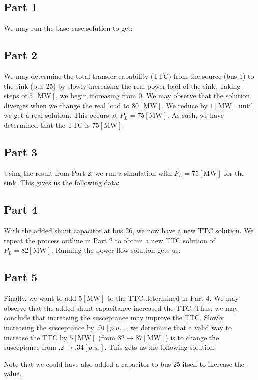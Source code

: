 \documentclass[
	letterpaper, %
	10pt, %
]{CSUniSchoolLabReport}
\begin{document}
\subsection{Part 1}

We may run the base case solution to get:


\subsection{Part 2}

We may determine the total transfer capability (TTC) from the source (bus 1) to the sink (bus 25) by slowly increasing the real power load of the sink. Taking steps of $5[\si{\mega\watt}]$, we begin increasing from 0. We may observe that the solution diverges when we change the real load to $80[\si{\mega\watt}]$. We reduce by $1[\si{\mega\watt}]$ until we get a real solution. This occurs at $P_L=75[\si{\mega\watt}]$. As such, we have determined that the TTC is $75[\si{\mega\watt}]$.

\subsection{Part 3}

Using the result from Part 2, we run a simulation with $P_L=75[\si{\mega\watt}]$ for the sink. This gives us the following data:


\subsection{Part 4}

With the added shunt capacitor at bus 26, we now have a new TTC solution. We repeat the process outline in Part 2 to obtain a new TTC solution of $P_L=82[\si{\mega\watt}]$. Running the power flow solution gets us:


\subsection{Part 5}

Finally, we want to add $5[\si{\mega\watt}]$ to the TTC determined in Part 4. We may observe that the added shunt capacitance increased the TTC. Thus, we may conclude that increasing the susceptance may improve the TTC. Slowly increasing the susceptance by $.01[p.u.]$, we determine that a valid way to increase the TTC by $5[\si{\mega\watt}]$ (from $82\to87[\si{\mega\watt}]$) is to change the susceptance from $.2\to.34[p.u.]$. This gets us the following solution:


Note that we could have also added a capacitor to bus 25 itself to increase the value.
\end{document}
